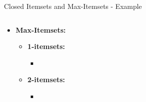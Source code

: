 \begin{frame}{Closed Itemsets and Max-Itemsets - Example}
\begin{columns}
\begin{column}{0.5\textwidth}
\begin{itemize}
				      \begin{itemize}
					      \item \textbf{1-itemsets:} \\
					            \begin{itemize}
						            \item {}
					            \end{itemize}
					      \item \textbf{2-itemsets:} \\
					            \begin{itemize}
						            \item {}
					            \end{itemize}
				      \end{itemize}
				\item \textbf{Max-Itemsets:}
				      \begin{itemize}
					      \item \textbf{1-itemsets:} \\
					            \begin{itemize}
						            \item {}
					            \end{itemize}
					      \item \textbf{2-itemsets:} \\
					            \begin{itemize}
						            \item {}
					            \end{itemize}
				      \end{itemize}
			\end{itemize}
		\end{column}
	\end{columns}
\end{frame}
